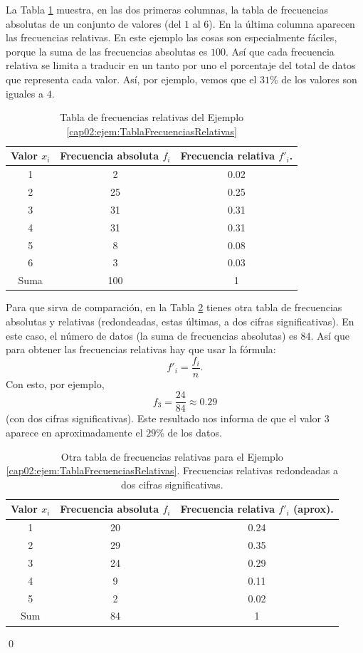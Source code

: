 \begin{ejemplo}
\label{cap02:ejem:TablaFrecuenciasRelativas}
La Tabla \ref{cap02:tabla:TablaFrecuenciasRelativas} muestra, en las dos primeras columnas, la tabla de frecuencias absolutas de un conjunto de valores (del $1$ al $6$). En la última columna aparecen las frecuencias relativas. En este ejemplo las cosas son especialmente fáciles, porque la suma de las frecuencias absolutas es $100$. Así que cada frecuencia relativa se limita a traducir en un tanto por uno el porcentaje del total de datos que representa cada valor. Así, por ejemplo, vemos que el $31\%$ de los valores son iguales a $4$.

\begin{table}[ht]
\centering
\begin{tabular}{|c|c|c|}
  \hline
 Valor $x_i$& Frecuencia absoluta $f_i$ & Frecuencia relativa $f'_i$.\\
  \hline
  1 & 2 & 0.02 \\
  2 & 25 & 0.25 \\
  3 & 31 & 0.31 \\
  4 & 31 & 0.31 \\
  5 & 8 & 0.08 \\
  6 & 3 & 0.03 \\
   \hline
   Suma&100&1\\
   \hline
\end{tabular}
\caption{Tabla de frecuencias relativas del Ejemplo \ref{cap02:ejem:TablaFrecuenciasRelativas}}
\label{cap02:tabla:TablaFrecuenciasRelativas}
\end{table}

Para que sirva de comparación, en la Tabla \ref{cap02:tabla:TablaFrecuenciasRelativas02} tienes otra tabla de frecuencias absolutas  y relativas (redondeadas, estas últimas, a dos cifras significativas). En este caso, el número de datos (la suma de frecuencias absolutas) es $84$. Así que para obtener las frecuencias relativas hay que usar la fórmula:
\[f'_i=\dfrac{f_i}{n}.\]
Con esto, por ejemplo,
\[f_3=\dfrac{24}{84}\approx 0.29\]
(con dos cifras significativas). Este resultado nos informa de que el valor $3$ aparece en aproximadamente el $29\%$ de  los datos.

\begin{table}[ht]
\centering
\begin{tabular}{|c|c|c|}
  \hline
 Valor $x_i$& Frecuencia absoluta $f_i$ & Frecuencia relativa $f'_i$ (aprox).\\
  \hline
  1 & 20 & 0.24 \\
  2 & 29 & 0.35 \\
  3 & 24 & 0.29 \\
  4 & 9 & 0.11 \\
  5 & 2 & 0.02 \\
  \hline
  Sum & 84 & 1 \\
 \hline
\end{tabular}
\caption{Otra tabla de frecuencias relativas para el Ejemplo \ref{cap02:ejem:TablaFrecuenciasRelativas}. Frecuencias relativas redondeadas a dos cifras significativas.}
\label{cap02:tabla:TablaFrecuenciasRelativas02}
\end{table}


\qed
\end{ejemplo}

